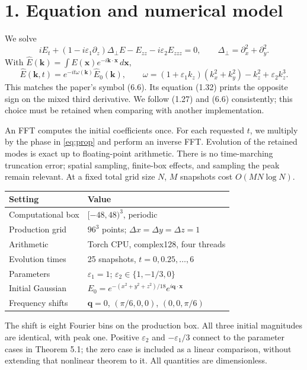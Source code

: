 \documentclass[10pt,letterpaper]{article}
\begin{document}
\section*{1. Equation and numerical model}
We solve
\begin{equation}
 iE_t+(1-i\varepsilon_1\partial_z)\Delta_\perp E-E_{zz}
       -i\varepsilon_2 E_{zzz}=0,
 \qquad \Delta_\perp=\partial_x^2+\partial_y^2.
 \label{eq:pde}
\end{equation}
With $\widehat E(\mathbf k)=\int E(\mathbf x)e^{-i\mathbf k\cdot\mathbf x}\,d\mathbf x$,
\begin{equation}
 \widehat E(\mathbf k,t)=e^{-it\omega(\mathbf k)}\widehat E_0(\mathbf k),\qquad
 \omega=(1+\varepsilon_1 k_z)(k_x^2+k_y^2)-k_z^2+\varepsilon_2k_z^3.
 \label{eq:prop}
\end{equation}
This matches the paper's symbol (6.6). Its equation (1.32) prints the opposite sign
on the mixed third derivative. We follow (1.27) and (6.6) consistently; this choice
must be retained when comparing with another implementation.

An FFT computes the initial coefficients once. For each requested $t$, we multiply
by the phase in \eqref{eq:prop} and perform an inverse FFT. Evolution of the retained
modes is exact up to floating-point arithmetic. There is no time-marching truncation
error; spatial sampling, finite-box effects, and sampling the peak remain relevant.
At a fixed total grid size $N$, $M$ snapshots cost $O(MN\log N)$.

\begin{center}
\begin{tabular}{ll}\toprule
Setting & Value \\\midrule
Computational box & $[-48,48)^3$, periodic \\
Production grid & $96^3$ points; $\Delta x=\Delta y=\Delta z=1$ \\
Arithmetic & Torch CPU, complex128, four threads \\
Evolution times & 25 snapshots, $t=0,0.25,\ldots,6$ \\
Parameters & $\varepsilon_1=1$; $\varepsilon_2\in\{1,-1/3,0\}$ \\
Initial Gaussian & $E_0=e^{-(x^2+y^2+z^2)/18}e^{i\mathbf q\cdot\mathbf x}$ \\
Frequency shifts & $\mathbf q=0$, $(\pi/6,0,0)$, $(0,0,\pi/6)$ \\\bottomrule
\end{tabular}
\end{center}
The shift is eight Fourier bins on the production box. All three initial magnitudes
are identical, with peak one. Positive $\varepsilon_2$ and $-\varepsilon_1/3$ connect
to the parameter cases in Theorem 5.1; the zero case is included as a linear comparison,
without extending that nonlinear theorem to it. All quantities are dimensionless.
\end{document}
